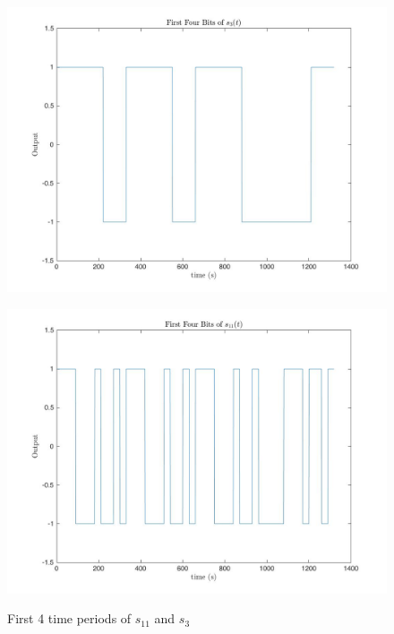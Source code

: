 \documentclass{article}
\begin{document}
\begin{figure}[!htb]
    \centering
    \begin{minipage}{.5\textwidth}
        \centering
        \includegraphics[width=1.0\linewidth, height=0.2\textheight]{s3.jpg}

        \label{fig:prob1_6_2}
    \end{minipage}%
    \begin{minipage}{0.5\textwidth}
        \centering
        \includegraphics[width=1\linewidth, height=0.2\textheight]{s11.jpg}

        \label{fig:prob1_6_1}
    \end{minipage}
    \caption{First 4 time periods of $s_11$ and $s_3$}
\end{figure}
\end{document}
